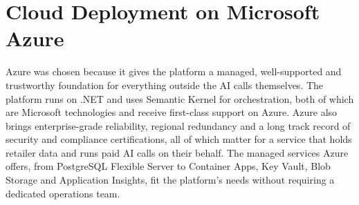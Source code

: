 \section{Cloud Deployment on Microsoft Azure}
\label{sec:azure-deployment}

Azure was chosen because it gives the platform a managed, well-supported and trustworthy foundation for everything outside the AI calls themselves. The platform runs on .NET and uses Semantic Kernel for orchestration, both of which are Microsoft technologies and receive first-class support on Azure. Azure also brings enterprise-grade reliability, regional redundancy and a long track record of security and compliance certifications, all of which matter for a service that holds retailer data and runs paid AI calls on their behalf. The managed services Azure offers, from PostgreSQL Flexible Server to Container Apps, Key Vault, Blob Storage and Application Insights, fit the platform's needs without requiring a dedicated operations team.

